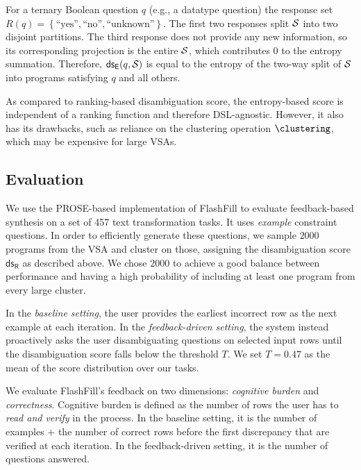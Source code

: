 \begin{example}
    For a ternary Boolean question $q$ (e.g., a datatype question) the response set $R(q) = \left\{\text{``yes''},
        \text{``no''}, \text{``unknown''}\right\}$.
    The first two responses split $\mathcal{S}$ into two disjoint partitions.
    The third response does not provide any new information, so its corresponding projection is the entire $\mathcal{S}$, which
    contributes 0 to the entropy summation.
    Therefore, $\mathsf{ds_E}(q , \mathcal{S})$ is equal to the entropy of the two-way split of $\mathcal{S}$ into programs satisfying
    $q$ and all others.
\end{example}

As compared to ranking-based disambiguation score, the entropy-based score is independent of a ranking function and
therefore DSL-agnostic.
However, it also has its drawbacks, such as reliance on the clustering operation $\clustering$, which may be expensive
for large VSAs.

\subsection{Evaluation}

We use the PROSE-based implementation of FlashFill to evaluate feedback-based synthesis on a set of 457 text
transformation tasks.
It uses \emph{example} constraint questions.
In order to efficiently generate these questions, we sample $2000$ programs from the VSA and cluster on those, assigning
the disambiguation score $\mathsf{ds_R}$ as described above.
We chose $2000$ to achieve a good balance between performance and having a high probability of including
at least one program from every large cluster.

In the \emph{baseline setting}, the user provides the earliest incorrect row as the next example at each iteration.
In the \emph{feedback-driven setting}, the system instead proactively asks the user disambiguating questions on selected
input rows until the disambiguation score falls below the threshold $T$.
We set $T = 0.47$ as the mean of the score distribution over our tasks.

We evaluate FlashFill's feedback on two dimensions: \emph{cognitive burden} and \emph{correctness}.
Cognitive burden is defined as the number of rows the user has to \emph{read and verify} in the process.
In the baseline setting, it is the number of examples $+$ the number of correct rows before the first discrepancy that
are verified at each iteration.
In the feedback-driven setting, it is the number of questions answered.

